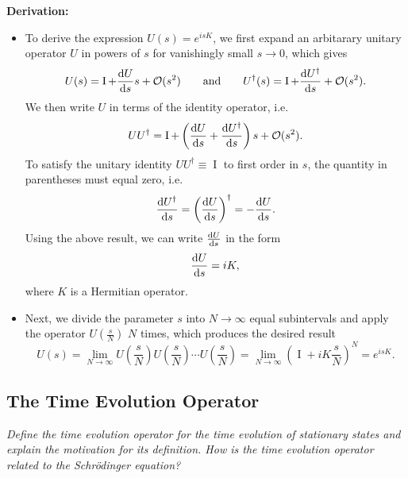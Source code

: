 \documentclass[11pt, a4paper]{article}
\newcommand{\Schro}{Schr\"{o}dinger\xspace}
\newcommand{\Herm}{Hermitian\xspace}
\newcommand{\II}{\operatorname{I}}  %
\begin{document}
\textbf{Derivation:}
\begin{itemize}
    \item To derive the expression $ U(s) = e^{isK} $, we first expand an arbitarary unitary operator $ U $ in powers of $ s $ for vanishingly small $ s \to 0 $, which gives
    \begin{equation*}
        U(s) = \II + \dv{U}{s}s + \mathcal{O}(s^{2}) \qquad \text{and} \qquad U^{\dagger}(s) = \II + \dv{U^{\dagger}}{s} + \mathcal{O}(s^{2}).
    \end{equation*}
    We then write $ U $ in terms of the identity operator, i.e.
    \begin{equation*}
        UU^{\dagger} = \II + \left( \dv{U}{s} + \dv{U^{\dagger}}{s} \right)s + \mathcal{O}(s^{2}).
    \end{equation*}
    To satisfy the unitary identity $ UU^{\dagger} \equiv \II $ to first order in $ s $, the quantity in parentheses must equal zero, i.e.
    \begin{equation*}
        \dv{U^{\dagger}}{s} = \left( \dv{U}{s} \right)^{\dagger} = -\dv{U}{s}.
    \end{equation*}
    Using the above result, we can write $ \dv{U}{s} $ in the form
    \begin{equation*}
        \dv{U}{s} = i K,
    \end{equation*}
    where $ K $ is a \Herm operator.

    \item Next, we divide the parameter $ s $ into $ N \to \infty $ equal subintervals and apply the operator $ U(\tfrac{s}{N}) $ $ N $ times, which produces the desired result
    \begin{equation*}
        U(s) = \lim_{N \to \infty} U \left(\frac{s}{N}\right) U\left(\frac{s}{N}\right) \cdots U\left(\frac{s}{N}\right) = \lim_{N \to \infty} \left( \II + i K \frac{s}{N} \right)^{N} = e^{isK}.
    \end{equation*}
    
\end{itemize}
    

\subsection{The Time Evolution Operator}
\textit{Define the time evolution operator for the time evolution of stationary states and explain the motivation for its definition. How is the time evolution operator related to the \Schro equation?}
\end{document}
